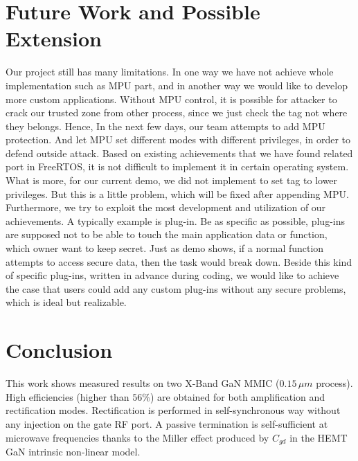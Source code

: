 \documentclass[conference]{IEEEtran}
\begin{document}

\section{Future Work and Possible Extension}
Our project still has many limitations. In one way we have not achieve whole implementation such as MPU part, and in another way we would like to develop more custom applications. 
Without MPU control, it is possible for attacker to crack our trusted zone from other process, since we just check the tag not where they belongs. Hence, In the next few days, our team attempts to add MPU protection. And let MPU set different modes with different privileges, in order to defend outside attack. Based on existing achievements that we have found related port in FreeRTOS, it is not difficult to implement it in certain operating system.
What is more, for our current demo, we did not implement to set tag to lower privileges. But this is a little problem, which will be fixed after appending MPU.
Furthermore, we try to exploit the most development and utilization of our achievements. A typically example is plug-in. Be as specific as possible, plug-ins are supposed not to be able to touch the main application data or function, which owner want to keep secret. Just as demo shows, if a normal function attempts to access secure data, then the task would break down. Beside this kind of specific plug-ins, written in advance during coding, we would like to achieve the case that users could add any custom plug-ins without any secure problems, which is ideal but realizable.



\section{Conclusion}
This work shows measured results on two X-Band GaN MMIC ($0.15\,\mu m$ process). High efficiencies (higher than $56\%$) are obtained for both amplification and rectification modes. Rectification is performed in self-synchronous way without any injection on the gate RF port. A passive termination is self-sufficient at microwave frequencies thanks to the Miller effect produced by $C_{gd}$ in the HEMT GaN intrinsic non-linear model.


\end{document}
